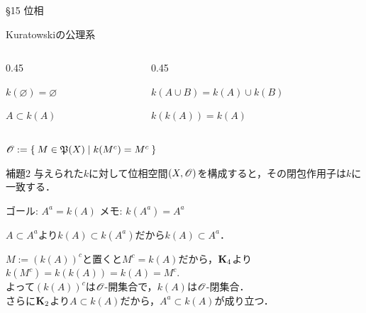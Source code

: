 \documentclass[uplatex,a4paper,dvipdfmx,aspectratio=169,11pt]{beamer}
\begin{document}
\begin{frame}[fragile]{\S 15 位相}
    \begin{block}{Kuratowskiの公理系}
        \vspace{-0.5em}
        \begin{columns}
            \begin{column}{0.45\textwidth}
                \begin{description}[$\textbf{K}_1$:]
                    \item[$\textbf{K}_1$:] $k(\varnothing) = \varnothing$
                    \item[$\textbf{K}_2$:] $A \subset k(A)$
                \end{description}
            \end{column}
            \begin{column}{0.45\textwidth}
                \begin{description}[$\textbf{K}_1$:]
                    \item[$\textbf{K}_3$:] $k(A \cup B) = k(A) \cup k(B)$
                    \item[$\textbf{K}_4$:] $k(k(A)) = k(A)$
                \end{description}
            \end{column}
        \end{columns}
    \end{block}
    $\mathscr{O} := \Set{ M \in {\mathord{\mathfrak{P}}\qty(X)} | k(M^c) = M^c}$

    \begin{block}{補題2}
        与えられた$k$に対して位相空間$(X, \mathscr{O})$を構成すると，その閉包作用子は$k$に一致する．
    \end{block}

    ゴール: $A^a = k(A)$ \quad メモ: $k(A^a) = A^a$

    \medskip{}

    \begin{description}[$(\supset)$]
        \item[$(\supset)$] $A \subset A^a$より$k(A) \subset k(A^a)$だから$k(A) \subset A^a$．
        \item[$(\subset)$] $M := (k(A))^c$と置くと$M^c = k(A)$だから，$\textbf{K}_4$より
            \begin{math}
                k(M^c) = k(k(A)) = k(A) = M^c.
            \end{math}\\
            よって$(k(A))^c$は$\mathscr{O}$-開集合で，$k(A)$は$\mathscr{O}$-閉集合．\\
            さらに$\textbf{K}_2$より$A \subset k(A)$だから，$A^a \subset k(A)$が成り立つ．
    \end{description}

\end{frame}
\end{document}

